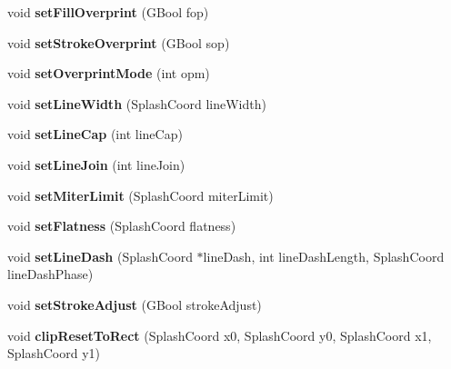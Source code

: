\begin{DoxyCompactItemize}
void {\bfseries set\+Fill\+Overprint} (G\+Bool fop)
\item 
\mbox{\label{class_splash_a051a358e45801533d46962d80f7b4c59}} 
void {\bfseries set\+Stroke\+Overprint} (G\+Bool sop)
\item 
\mbox{\label{class_splash_a6ec523ed5975f25a9376c451bd92a9dd}} 
void {\bfseries set\+Overprint\+Mode} (int opm)
\item 
\mbox{\label{class_splash_a14dce2571b9945cd2eb8108089e446d7}} 
void {\bfseries set\+Line\+Width} (Splash\+Coord line\+Width)
\item 
\mbox{\label{class_splash_ac2b9231585cda50ea89f7fa338ff2556}} 
void {\bfseries set\+Line\+Cap} (int line\+Cap)
\item 
\mbox{\label{class_splash_af71606158717cbb41ac9ec0e990b6507}} 
void {\bfseries set\+Line\+Join} (int line\+Join)
\item 
\mbox{\label{class_splash_adba96ffbb45a070d787331c6e4432533}} 
void {\bfseries set\+Miter\+Limit} (Splash\+Coord miter\+Limit)
\item 
\mbox{\label{class_splash_a9c7b426262b889f9db34e5c73511ddb8}} 
void {\bfseries set\+Flatness} (Splash\+Coord flatness)
\item 
\mbox{\label{class_splash_ae4bd1142a83ef18770c49f3ed321e1d2}} 
void {\bfseries set\+Line\+Dash} (Splash\+Coord $\ast$line\+Dash, int line\+Dash\+Length, Splash\+Coord line\+Dash\+Phase)
\item 
\mbox{\label{class_splash_af3629d897fe921752448955f5029c3e5}} 
void {\bfseries set\+Stroke\+Adjust} (G\+Bool stroke\+Adjust)
\item 
\mbox{\label{class_splash_adecd5e37987bdfc3f2cbae88dba784b6}} 
void {\bfseries clip\+Reset\+To\+Rect} (Splash\+Coord x0, Splash\+Coord y0, Splash\+Coord x1, Splash\+Coord y1)
\item 
\mbox{\label{class_splash_a34d006228f52d28102fa94fa5ebaee4b}} 

\end{DoxyCompactItemize}
